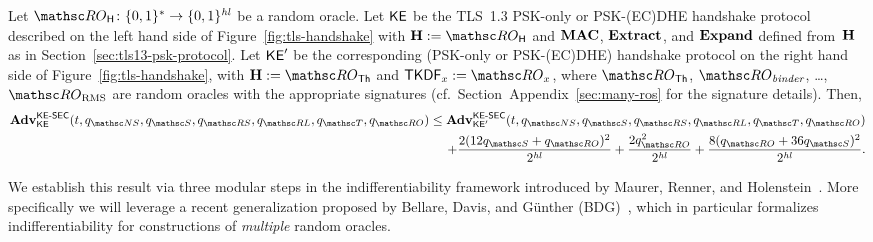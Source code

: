 \begin{theorem}
	\label{thm:full-ks-indiff}
	Let $\ROhash \colon \bits^{*} \to \bits^{\hashlen}$ be a random oracle.
	Let $\mathsf{KE}$ be the TLS~1.3 PSK-only or PSK-(EC)DHE handshake protocol described on the left hand side of Figure~\ref{fig:tls-handshake} with $\abstractHash := \ROhash$
	and $\mathbf{MAC}$, $\mathbf{Extract}$, and $\mathbf{Expand}$ defined from~$\mathbf{H}$ as in Section~\ref{sec:tls13-psk-protocol}. 
	Let $\mathsf{KE}'$ be the corresponding (PSK-only or PSK-(EC)DHE) handshake protocol on the right hand side of Figure~\ref{fig:tls-handshake}, with $\abstractHash := \ROthash$ and  $\TLSKDF_x := \RO_{x}$, where $\ROthash$, $\RObinder$, \dots, $\ROrms$ are random oracles with the appropriate signatures
		(cf.~\iffull Section~\else Appendix~\fi\ref{sec:many-ros}
	for the signature details).
%
	Then, %
	\begin{align*}
		\Adv^{\KESEC}_{\KE}(t, \qNewSecret, \qSend, \qRevSessionKey, \qRevLongTermKey, \qTest, \qRO)
		\leq
			\Adv^{\KESEC}_{\KE'}(t, \qNewSecret, \qSend, \qRevSessionKey, \qRevLongTermKey, \qTest, \qRO) \\
			+ \frac{2(12\qSend+\qRO)^2}{2^{\hashlen}}
			+ \frac{2\qRO^2}{2^{\hashlen}}
			+ \frac{8(\qRO+36\qSend)^2}{2^{\hashlen}}.
 	\end{align*}
\end{theorem}

We establish this result via three modular steps in the indifferentiability framework introduced by Maurer, Renner, and Holenstein~\cite{TCC:MauRenHol04}.
More specifically we will leverage a recent generalization proposed by Bellare, Davis, and Günther (BDG)~\cite{EC:BelDavGun20}, which in particular formalizes indifferentiability for constructions of \emph{multiple} random oracles.


